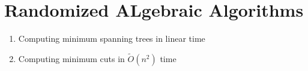 \section{Randomized ALgebraic Algorithms}

\begin{tcolorbox}[title=Sections, colback=blue!10, colframe=blue]
    \begin{enumerate}
        \item Computing minimum spanning trees in linear time
        \item Computing minimum cuts in $\tilde{O}(n^2)$ time
    \end{enumerate}
\end{tcolorbox}
